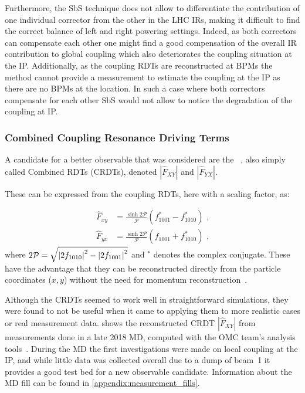 Furthermore, the SbS technique does not allow to differentiate the contribution of one individual corrector from the other in the LHC IRs, making it difficult to find the correct balance of left and right powering settings.
Indeed, as both correctors can compensate each other one might find a good compensation of the overall IR contribution to global coupling which also deteriorates the coupling situation at the IP.
Additionally, as the coupling RDTs are reconstructed at BPMs the method cannot provide a measurement to estimate the coupling at the IP as there are no BPMs at the location.
In such a case where both correctors compensate for each other SbS would not allow to notice the degradation of the coupling at IP.

\subsubsection*{Combined Coupling Resonance Driving Terms}

A candidate for a better observable that was considered are the ~\cite{PRAB:Franchi:First_Simultaneous}, also simply called Combined RDTs (CRDTs), denoted \(|\hat{F}_{XY}|\) and \(|\hat{F}_{YX}|\).
\break

These can be expressed from the coupling \glspl{RDT}, here with a scaling factor, as:

\begin{equation}
    \begin{aligned}
        \hat{F}_{xy} &= \frac{\sinh{2 \mathcal{P}}}{\mathcal{P}} \left( f^{\ast}_{1001} - f^{\ast}_{1010} \right)  \text{ ,} \\
        \hat{F}_{yx} &= \frac{\sinh{2 \mathcal{P}}}{\mathcal{P}} \left( f_{1001} + f^{\ast}_{1010} \right)         \text{ ,}
    \end{aligned}
    \label{equation:combined_coupling_rdts}
\end{equation}
where \(2 \mathcal{P} = \sqrt{\left\lvert 2 f_{1010} \right\rvert^2 - \left\lvert 2 f_{1001} \right\rvert^2}\) and \(^{\ast}\) denotes the complex conjugate.
These have the advantage that they can be reconstructed directly from the particle coordinates (\(x,y\)) without the need for momentum reconstruction~\cite{PRAB:Hofer:Coupling_Local_Observables}.

Although the CRDTs seemed to work well in straightforward simulations, they were found to not be useful when it came to applying them to more realistic cases or real measurement data.
 shows the reconstructed CRDT \(|\hat{F}_{XY}|\) from measurements done in a late \num{2018} \gls{MD}, computed with the \acrshort{OMC} team's analysis tools~\cite{CODE:OMC:omc3}.
During the MD the first investigations were made on local coupling at the IP, and while little data was collected overall due to a dump of beam~\num{1} it provides a good test bed for a new observable candidate.
Information about the MD fill can be found in \cref{appendix:measurement_fills}.

